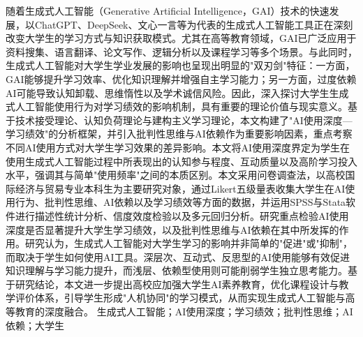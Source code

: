 \documentclass{njtech-thesis}
\begin{document}
\makecover

\makedeclaration

\makefrontmatter

\begin{cnabstract}{随着生成式人工智能（Generative Artificial Intelligence，GAI）技术的快速发展，以ChatGPT、DeepSeek、文心一言等为代表的生成式人工智能工具正在深刻改变大学生的学习方式与知识获取模式。尤其在高等教育领域，GAI已广泛应用于资料搜集、语言翻译、论文写作、逻辑分析以及课程学习等多个场景。与此同时，生成式人工智能对大学生学业发展的影响也呈现出明显的"双刃剑"特征：一方面，GAI能够提升学习效率、优化知识理解并增强自主学习能力；另一方面，过度依赖AI可能导致认知卸载、思维惰性以及学术诚信风险。因此，深入探讨大学生生成式人工智能使用行为对学习绩效的影响机制，具有重要的理论价值与现实意义。基于技术接受理论、认知负荷理论与建构主义学习理论，本文构建了"AI使用深度—学习绩效"的分析框架，并引入批判性思维与AI依赖作为重要影响因素，重点考察不同AI使用方式对大学生学习效果的差异影响。本文将AI使用深度界定为学生在使用生成式人工智能过程中所表现出的认知参与程度、互动质量以及高阶学习投入水平，强调其与简单"使用频率"之间的本质区别。本文采用问卷调查法，以高校国际经济与贸易专业本科生为主要研究对象，通过Likert五级量表收集大学生在AI使用行为、批判性思维、AI依赖以及学习绩效等方面的数据，并运用SPSS与Stata软件进行描述性统计分析、信度效度检验以及多元回归分析。研究重点检验AI使用深度是否显著提升大学生学习绩效，以及批判性思维与AI依赖在其中所发挥的作用。研究认为，生成式人工智能对大学生学习的影响并非简单的"促进"或"抑制"，而取决于学生如何使用AI工具。深层次、互动式、反思型的AI使用能够有效促进知识理解与学习能力提升，而浅层、依赖型使用则可能削弱学生独立思考能力。基于研究结论，本文进一步提出高校应加强大学生AI素养教育，优化课程设计与教学评价体系，引导学生形成"人机协同"的学习模式，从而实现生成式人工智能与高等教育的深度融合。}
生成式人工智能；AI使用深度；学习绩效；批判性思维；AI依赖；大学生
\end{cnabstract}
\end{document}
